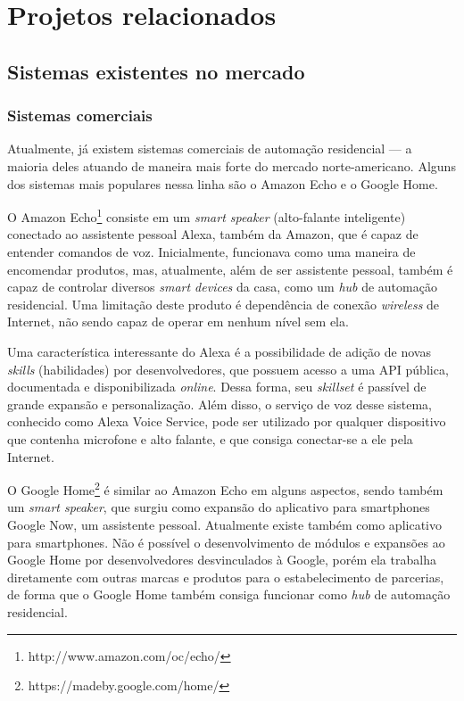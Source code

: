 \chapter{Projetos relacionados}

\section{Sistemas existentes no mercado}

\subsection{Sistemas comerciais}
Atualmente, já existem sistemas comerciais de automação residencial --- a maioria deles atuando de maneira mais forte do mercado norte-americano. Alguns dos sistemas mais populares nessa linha são o Amazon Echo e o Google Home.

O Amazon Echo\footnote{http://www.amazon.com/oc/echo/} consiste em um \textit{smart speaker} (alto-falante inteligente) conectado ao assistente pessoal Alexa, também da Amazon, que é capaz de entender comandos de voz. Inicialmente, funcionava como uma maneira de encomendar produtos, mas, atualmente, além de ser assistente pessoal, também é capaz de controlar diversos \textit{smart devices} da casa, como um \textit{hub} de automação residencial. Uma limitação deste produto é dependência de conexão \textit{wireless} de Internet, não sendo capaz de operar em nenhum nível sem ela.

Uma característica interessante do Alexa é a possibilidade de adição de novas \textit{skills} (habilidades) por desenvolvedores, que possuem acesso a uma API pública, documentada e disponibilizada \textit{online}. Dessa forma, seu \textit{skillset} é passível de grande expansão e personalização. Além disso, o serviço de voz desse sistema, conhecido como Alexa Voice Service, pode ser utilizado por qualquer dispositivo que contenha microfone e alto falante, e que consiga conectar-se a ele pela Internet.

O Google Home\footnote{https://madeby.google.com/home/} é similar ao Amazon Echo em alguns aspectos, sendo também um \textit{smart speaker}, que surgiu como expansão do aplicativo para smartphones Google Now, um assistente pessoal. Atualmente existe também como aplicativo para smartphones. Não é possível o desenvolvimento de módulos e expansões ao Google Home por desenvolvedores desvinculados à Google, porém ela trabalha diretamente com outras marcas e produtos para o estabelecimento de parcerias, de forma que o Google Home também consiga funcionar como \textit{hub} de automação residencial.

